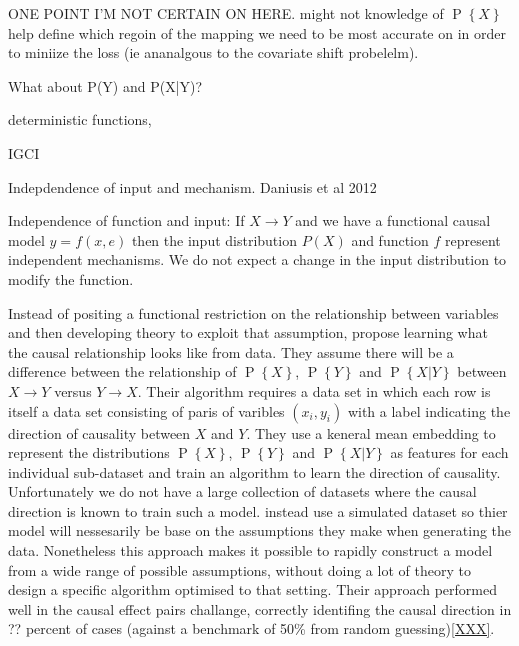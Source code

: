 \documentclass[11pt,a4paper,oneside]{book}
\renewcommand{\P}[1]{\operatorname{P}\left\{#1\right\}}
\begin{document}
ONE POINT I'M NOT CERTAIN ON HERE. might not knowledge of $\P{X}$ help define which regoin of the mapping we need to be most accurate on in order to miniize the loss (ie ananalgous to the covariate shift probelelm). 

What about P(Y) and P(X|Y)?


deterministic functions,

IGCI \cite{Janzing2012a}

Indepdendence of input and mechanism. Daniusis et al 2012

Independence of function and input: If $X \rightarrow Y$ and we have a functional causal model $y = f(x,e)$ then the input
distribution $P(X)$ and function $f$ represent independent mechanisms. We do not expect a change in the input distribution to modify the function. 


Instead of positing a functional restriction on the relationship between variables and then developing theory to exploit that assumption, \citep{LopezPaz2014} propose learning what the causal relationship looks like from data. They assume there will be a difference between the relationship of $\P{X}$, $\P{Y}$ and $\P{X|Y}$ between $X \rightarrow Y$ versus $Y \rightarrow X$. Their algorithm requires a data set in which each row is itself a data set consisting of paris of varibles $(x_i,y_i)$ with a label indicating the direction of causality between $X$ and $Y$. They use a keneral mean embedding to represent the distributions $\P{X}$, $\P{Y}$ and $\P{X|Y}$ as features for each individual sub-dataset and train an algorithm to learn the direction of causality. Unfortunately we do not have a large collection of datasets where the causal direction is known to train such a model. \citep{LopezPaz2014} instead use a simulated dataset so thier model will nessesarily be base on the assumptions they make when generating the data. Nonetheless this approach makes it possible to rapidly construct a model from a wide range of possible assumptions, without doing a lot of theory to design a specific algorithm optimised to that setting. Their approach performed well in the causal effect pairs challange, correctly identifing the causal direction in ?? percent of cases (against a benchmark of 50\% from random guessing)\ref{XXX}.
\end{document}
